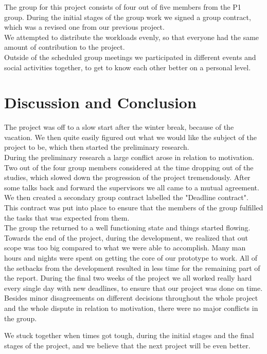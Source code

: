 The group for this project consists of four out of five members from the P1 group. During the initial stages of the group work we signed a group contract, which was a revised one from our previous project.\\
We attempted to distribute the workloads evenly, so that everyone had the same amount of contribution to the project.\\
Outside of the scheduled group meetings we participated in different events and social activities together, to get to know each other better on a personal level.
\section{Discussion and Conclusion}

The project was off to a slow start after the winter break, because of the vacation. We then quite easily figured out what we would like the subject of the project to be, which then started the preliminary research.\\
During the preliminary research a large conflict arose in relation to motivation. Two out of the four group members considered at the time dropping out of the studies, which slowed down the progression of the project tremendously. After some talks back and forward the supervisors we all came to a mutual agreement. We then created a secondary group contract labelled the "Deadline contract". This contract was put into place to ensure that the members of the group fulfilled the tasks that was expected from them.\\
The group the returned to a well functioning state and things started flowing. Towards the end of the project, during the development, we realized that out scope was too big compared to what we were able to accomplish. Many man hours and nights were spent on getting the core of our  prototype to work. All of the setbacks from the development resulted in less time for the remaining part of the report. During the final two weeks of the project we all worked really hard every single day with new deadlines, to ensure that our project was done on time.\\
Besides minor disagreements on different decisions throughout the whole project and the whole dispute in relation to motivation, there were no major conflicts in the group.

We stuck together when times got tough, during the initial stages and the final stages of the project, and we believe that the next project will be even better.